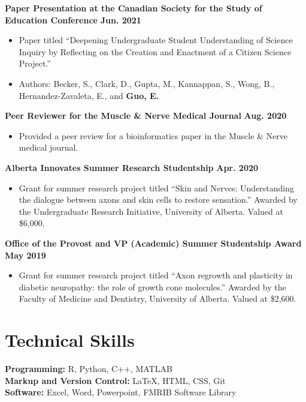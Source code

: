 \documentclass{article}
\begin{document}
\textbf{Paper Presentation at the Canadian Society for the Study of Education Conference} \hfill \textbf{Jun. 2021}
\begin{itemize}
    \item Paper titled ``Deepening Undergraduate Student Understanding of Science Inquiry by Reflecting on the Creation and Enactment of a Citizen Science Project.''
    \item Authors: Becker, S., Clark, D., Gupta, M., Kannappan, S., Wong, B., Hernandez-Zavaleta, E., and \textbf{Guo, E.}
\end{itemize}

\textbf{Peer Reviewer for the Muscle \& Nerve Medical Journal} \hfill \textbf{Aug. 2020}
\begin{itemize}
    \item Provided a peer review for a bioinformatics paper in the Muscle \& Nerve medical journal.
\end{itemize}

\textbf{Alberta Innovates Summer Research Studentship} \hfill \textbf{Apr. 2020}
\begin{itemize}
    \item Grant for summer research project titled ``Skin and Nerves: Understanding the dialogue between axons and skin cells to restore sensation.'' Awarded by the Undergraduate Research Initiative, University of Alberta. Valued at \$6,000.
\end{itemize}
\textbf{Office of the Provost and VP (Academic) Summer Studentship Award} \hfill \textbf{May 2019}
    \begin{itemize}
        \item Grant for summer research project titled ``Axon regrowth and plasticity in diabetic neuropathy: the role of growth cone molecules.'' Awarded by the Faculty of Medicine and Dentistry, University of Alberta. Valued at \$2,600.
    \end{itemize}


\section*{\textcolor{my_colour}{Technical Skills}}
\vspace{-.25em} \hrulefill \vspace{.75em}

\textbf{Programming:} R, Python, C++, MATLAB \\
\textbf{Markup and Version Control:} \LaTeX, HTML, CSS, Git \\
\textbf{Software:} Excel, Word, Powerpoint, FMRIB Software Library
\end{document}
